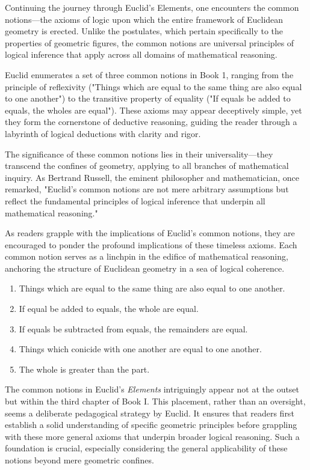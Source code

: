 Continuing the journey through Euclid's Elements, one encounters the common notions—the axioms of logic upon which the entire framework of Euclidean geometry is erected. Unlike the postulates, which pertain specifically to the properties of geometric figures, the common notions are universal principles of logical inference that apply across all domains of mathematical reasoning.

Euclid enumerates a set of three common notions in Book 1, ranging from the principle of reflexivity ("Things which are equal to the same thing are also equal to one another") to the transitive property of equality ("If equals be added to equals, the wholes are equal"). These axioms may appear deceptively simple, yet they form the cornerstone of deductive reasoning, guiding the reader through a labyrinth of logical deductions with clarity and rigor.

The significance of these common notions lies in their universality—they transcend the confines of geometry, applying to all branches of mathematical inquiry. As Bertrand Russell, the eminent philosopher and mathematician, once remarked, "Euclid's common notions are not mere arbitrary assumptions but reflect the fundamental principles of logical inference that underpin all mathematical reasoning."

As readers grapple with the implications of Euclid's common notions, they are encouraged to ponder the profound implications of these timeless axioms. Each common notion serves as a linchpin in the edifice of mathematical reasoning, anchoring the structure of Euclidean geometry in a sea of logical coherence.

\begin{cn}

\begin{enumerate}
\item Things which are equal to the same thing are also equal to one another.
\item If equal be added to equals, the whole are equal.
\item If equals be subtracted from equals, the remainders are equal.
\item Things which conicide with one another are equal to one another.
\item The whole is greater than the part.
\end{enumerate}

\end{cn}

The common notions in Euclid's \textit{Elements} intriguingly appear not at the outset but within the third chapter of Book I. This placement, rather than an oversight, seems a deliberate pedagogical strategy by Euclid. It ensures that readers first establish a solid understanding of specific geometric principles before grappling with these more general axioms that underpin broader logical reasoning. Such a foundation is crucial, especially considering the general applicability of these notions beyond mere geometric confines.

